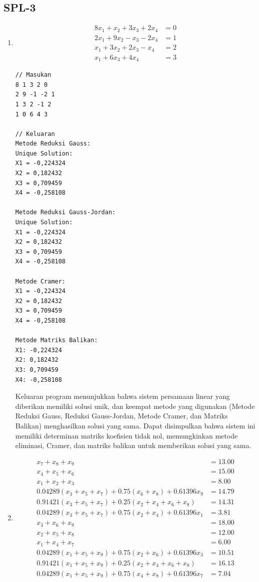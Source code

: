 \pagebreak
\subsection{SPL-3}
\begin{enumerate}[label=(\alph*)]
    \item 
\begin{align*}
    8x_1 + x_2 + 3x_3 + 2x_4 &= 0 \\
    2x_1 + 9x_2 - x_3 - 2x_4 &= 1 \\
    x_1 + 3x_2 + 2x_3 - x_4 &= 2 \\
    x_1 + 6x_3 + 4x_4 &= 3
\end{align*}

\begin{lstlisting}[caption = spl-3a.txt]
// Masukan
8 1 3 2 0
2 9 -1 -2 1
1 3 2 -1 2
1 0 6 4 3

// Keluaran
Metode Reduksi Gauss:
Unique Solution:
X1 = -0,224324
X2 = 0,182432
X3 = 0,709459
X4 = -0,258108

Metode Reduksi Gauss-Jordan:
Unique Solution:
X1 = -0,224324
X2 = 0,182432
X3 = 0,709459
X4 = -0,258108

Metode Cramer:
X1 = -0,224324
X2 = 0,182432
X3 = 0,709459
X4 = -0,258108

Metode Matriks Balikan:
X1: -0,224324
X2: 0,182432
X3: 0,709459
X4: -0,258108\end{lstlisting}

Keluaran program menunjukkan bahwa sistem persamaan linear yang diberikan memiliki solusi unik, dan keempat metode yang digunakan (Metode Reduksi Gauss, Reduksi Gauss-Jordan, Metode Cramer, dan Matriks Balikan) menghasilkan solusi yang sama. Dapat disimpulkan bahwa sistem ini memiliki determinan matriks koefisien tidak nol, memungkinkan metode eliminasi, Cramer, dan matriks balikan untuk memberikan solusi yang sama.

\pagebreak
    \item
\begin{align*}
    x_7 + x_8 + x_9 &= 13.00 \\
    x_4 + x_5 + x_6 &= 15.00 \\
    x_1 + x_2 + x_3 &= 8.00 \\
    0.04289(x_3 + x_5 + x_7) + 0.75(x_6 + x_8) + 0.61396x_9 &= 14.79 \\
    0.91421(x_3 + x_5 + x_7) + 0.25(x_2 + x_4 + x_6 + x_8) &= 14.31 \\
    0.04289(x_3 + x_5 + x_7) + 0.75(x_2 + x_4) + 0.61396x_1 &= 3.81 \\
    x_3 + x_6 + x_9 &= 18.00 \\
    x_2 + x_5 + x_8 &= 12.00 \\
    x_1 + x_4 + x_7 &= 6.00 \\
    0.04289(x_1 + x_5 + x_9) + 0.75(x_2 + x_6) + 0.61396x_3 &= 10.51\\
    0.91421(x_1 + x_5 + x_9) + 0.25(x_2 + x_4 + x_6 + x_8) &= 16.13 \\
    0.04289(x_1 + x_5 + x_9) + 0.75(x_4 + x_8) + 0.61396x_7 &= 7.04
\end{align*}


\end{enumerate}
